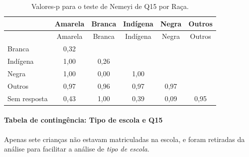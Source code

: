 \documentclass[]{article}
\let\oldparagraph\paragraph
\renewcommand{\paragraph}[1]{\oldparagraph{#1}\mbox{}}
\begin{document}
\begin{longtable}[]{@{}lccccc@{}}
\caption{\label{tab:unnamed-chunk-110}Valores-p para o teste de Nemeyi de Q15 por Raça.}\tabularnewline
\toprule
& Amarela & Branca & Indígena & Negra & Outros\tabularnewline
\midrule
\endfirsthead
\toprule
& Amarela & Branca & Indígena & Negra & Outros\tabularnewline
\midrule
\endhead
Branca & 0,32 & & & &\tabularnewline
Indígena & 1,00 & 0,26 & & &\tabularnewline
Negra & 1,00 & 0,00 & 1,00 & &\tabularnewline
Outros & 0,97 & 0,96 & 0,97 & 0,97 &\tabularnewline
Sem resposta & 0,43 & 1,00 & 0,39 & 0,09 & 0,95\tabularnewline
\bottomrule
\end{longtable}

\cleardoublepage

\hypertarget{tabela-de-continguxeancia-tipo-de-escola-e-q15}{%
\paragraph{Tabela de contingência: Tipo de escola e Q15}\label{tabela-de-continguxeancia-tipo-de-escola-e-q15}}

Apenas sete crianças não estavam matriculadas na escola, e foram retiradas da análise para facilitar a análise de \emph{tipo de escola}.
\end{document}
